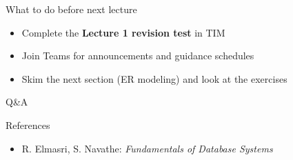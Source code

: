 \documentclass[10pt,aspectratio=169]{beamer}
\begin{document}
\begin{frame}{What to do before next lecture}
\begin{itemize}
  \item Complete the \textbf{Lecture 1 revision test} in TIM
  \item Join Teams for announcements and guidance schedules
  \item Skim the next section (ER modeling) and look at the exercises
\end{itemize}
\end{frame}

\begin{frame}{Q\&A}
\end{frame}

\begin{frame}{References}
\small
\begin{itemize}
  \item R. Elmasri, S. Navathe: \emph{Fundamentals of Database Systems}
\end{itemize}
\end{frame}
\end{document}
